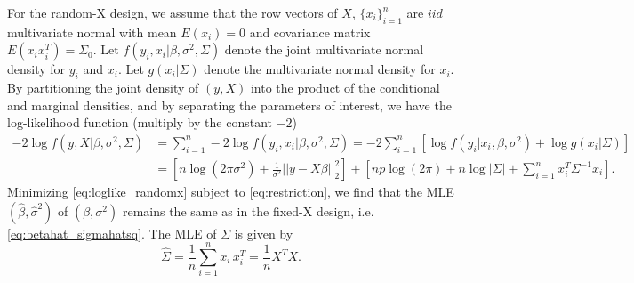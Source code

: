 For the random-X design, we assume that the row vectors of $X$, $\{x_i\}_{i=1}^n$ are $iid$ multivariate normal with mean $E(x_i)=0$ and covariance matrix $E(x_i x_i^T)=\Sigma_0$. Let $f(y_i,x_i|\beta,\sigma^2,\Sigma)$ denote the joint multivariate normal density for $y_i$ and $x_i$. Let $g(x_i|\Sigma)$ denote the multivariate normal density for $x_i$. By partitioning the joint density of $(y,X)$ into the product of the conditional and marginal densities, and by separating the parameters of interest, we have the log-likelihood function (multiply by the constant $-2$)
\begin{equation}
\begin{aligned}
-2 \log f(y, X|\beta,\sigma^2,\Sigma) &= \sum_{i=1}^n -2 \log f(y_i, x_i|\beta,\sigma^2,\Sigma) = -2 \sum_{i=1}^n [\log f(y_i|x_i,\beta,\sigma^2) + \log g(x_i|\Sigma)] \\
&= \left [ n \log (2\pi \sigma^2) + \frac{1}{\sigma^2} || y-X\beta||_2^2 \right ] + \left [np \log(2\pi) + n \log |\Sigma| + \sum_{i=1}^n x_i^T \Sigma^{-1} x_i \right ].
\end{aligned}
\label{eq:loglike_randomx}
\end{equation}
Minimizing \eqref{eq:loglike_randomx} subject to \eqref{eq:restriction}, we find that the MLE $(\hat{\beta}, \hat{\sigma}^2)$ of $(\beta, \sigma^2)$ remains the same as in the fixed-X design, i.e. \eqref{eq:betahat_sigmahatsq}. The MLE of $\Sigma$ is given by
\begin{equation*}
\hat \Sigma = \frac{1}{n} \sum_{i=1}^n x_i \, x_i^T = \frac{1}{n} X^T X.
\end{equation*}

